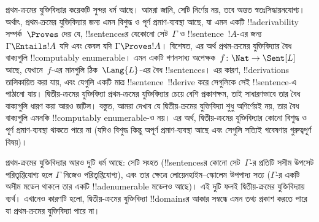 \documentclass[../../../include/open-logic-section]{subfiles}
\begin{document}


প্রথম-ক্রমের যুক্তিবিদ্যার কয়েকটি সুন্দর ধর্ম আছে। আমরা জানি, সেটি
নির্ণেয় নয়, তবে অন্তত স্বতঃসিদ্ধায়নযোগ্য। অর্থাৎ, প্রথম-ক্রমের
যুক্তিবিদ্যার জন্য এমন বিশুদ্ধ ও পূর্ণ প্রমাণ-ব্যবস্থা আছে, যা এমন একটি
!!a{derivability} সম্পর্ক~$\Proves$ দেয় যে, !!{sentence}sর যেকোনো
সেট~$\Gamma$ ও !!{sentence}~$!A$-এর জন্য $\Gamma \Entails !A$ যদি এবং
কেবল যদি $\Gamma \Proves !A$। বিশেষত, এর অর্থ প্রথম-ক্রমের যুক্তিবিদ্যার
বৈধ বাক্যগুলি !!{computably
  enumerable}। এমন একটি গণনসাধ্য অপেক্ষক~$f\colon \Nat \to
\Sent[L]$ আছে, যেখানে~$f$-এর মানগুলি ঠিক~$\Lang{L}$-এর বৈধ !!{sentence}s। এর
কারণ, !!{derivation}s তালিকায়িত করা যায়, এবং যেগুলি একটি মাত্র
!!{sentence}~!!{derive} করে সেগুলিকে সেই !!{sentence}-এ পাঠানো যায়।
দ্বিতীয়-ক্রমের যুক্তিবিদ্যা প্রথম-ক্রমের যুক্তিবিদ্যার চেয়ে বেশি
প্রকাশক্ষম, তাই সাধারণভাবে তার বৈধ বাক্যগুলি ধারণ করা আরও জটিল। বস্তুত,
আমরা দেখাব যে দ্বিতীয়-ক্রমের যুক্তিবিদ্যা শুধু অণির্ণেয়ই নয়, তার বৈধ
বাক্যগুলি এমনকি !!{computably
  enumerable}-ও নয়। এর অর্থ, দ্বিতীয়-ক্রমের যুক্তিবিদ্যার কোনো বিশুদ্ধ
ও পূর্ণ প্রমাণ-ব্যবস্থা থাকতে পারে না (যদিও বিশুদ্ধ কিন্তু অপূর্ণ
প্রমাণ-ব্যবস্থা আছে এবং সেগুলি সত্যিই গবেষণার গুরুত্বপূর্ণ বিষয়)।

প্রথম-ক্রমের যুক্তিবিদ্যার আরও দুটি ধর্ম আছে: সেটি সংহত
(!!{sentence}sর কোনো সেট~$\Gamma$-র প্রতিটি সসীম উপসেট
পরিতৃপ্তিযোগ্য হলে $\Gamma$ নিজেও পরিতৃপ্তিযোগ্য), এবং তার ক্ষেত্রে
লোয়েনহাইম--স্কোলেম উপপাদ্য সত্য ($\Gamma$-র একটি অসীম মডেল থাকলে তার
একটি !!a{denumerable} মডেলও আছে)। এই দুটি ফলই দ্বিতীয়-ক্রমের
যুক্তিবিদ্যায় ব্যর্থ। এখানেও কারণটি হলো, দ্বিতীয়-ক্রমের যুক্তিবিদ্যা
!!{domain}sর আকার সম্বন্ধে এমন তথ্য প্রকাশ করতে পারে যা প্রথম-ক্রমের
যুক্তিবিদ্যা পারে না।
\end{document}
